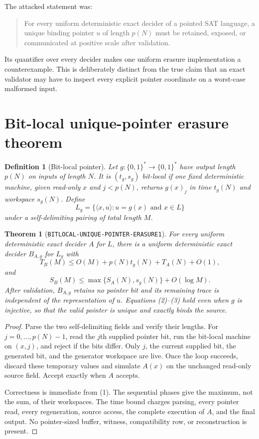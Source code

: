 \documentclass[11pt]{article}
\newtheorem{definition}{Definition}
\newtheorem{theorem}{Theorem}
\begin{document}
The attacked statement was:
\begin{quote}
For every uniform deterministic exact decider of a pointed SAT language, a
unique binding pointer $u$ of length $p(N)$ must be retained, exposed, or
communicated at positive scale after validation.
\end{quote}
Its quantifier over every decider makes one uniform erasure implementation a
counterexample.  This is deliberately distinct from the true claim that an
exact validator may have to inspect every explicit pointer coordinate on a
worst-case malformed input.

\section{Bit-local unique-pointer erasure theorem}

\begin{definition}[Bit-local pointer]
Let $g:\{0,1\}^*\to\{0,1\}^*$ have output length $p(N)$ on inputs of
length $N$.  It is $(t_g,s_g)$ bit-local if one fixed deterministic machine,
given read-only $x$ and $j<p(N)$, returns $g(x)_j$ in time $t_g(N)$ and
workspace $s_g(N)$.  Define
\[
 L_g=\{\langle x,u\rangle:u=g(x)\text{ and }x\in L\}
 \tag{1}
\]
under a self-delimiting pairing of total length $M$.
\end{definition}

\begin{theorem}[\texttt{BITLOCAL-UNIQUE-POINTER-ERASURE1}]
For every uniform deterministic exact decider $A$ for $L$, there is a uniform
deterministic exact decider $B_{A,g}$ for $L_g$ with
\[
 T_B(M)\le O(M)+p(N)t_g(N)+T_A(N)+O(1),
 \tag{2}
\]
and
\[
 S_B(M)\le
 \max\{S_A(N),s_g(N)\}+O(\log M).
 \tag{3}
\]
After validation, $B_{A,g}$ retains no pointer bit and its remaining trace is
independent of the representation of $u$.  Equations (2)--(3) hold even when
$g$ is injective, so that the valid pointer is unique and exactly binds the
source.
\end{theorem}

\begin{proof}
Parse the two self-delimiting fields and verify their lengths.  For
$j=0,\ldots,p(N)-1$, read the $j$th supplied pointer bit, run the bit-local
machine on $(x,j)$, and reject if the bits differ.  Only $j$, the current
supplied bit, the generated bit, and the generator workspace are live.  Once
the loop succeeds, discard these temporary values and simulate $A(x)$ on the
unchanged read-only source field.  Accept exactly when $A$ accepts.

Correctness is immediate from (1).  The sequential phases give the maximum,
not the sum, of their workspaces.  The time bound charges parsing, every
pointer read, every regeneration, source access, the complete execution of
$A$, and the final output.  No pointer-sized buffer, witness, compatibility
row, or reconstruction is present.
\end{proof}
\end{document}
